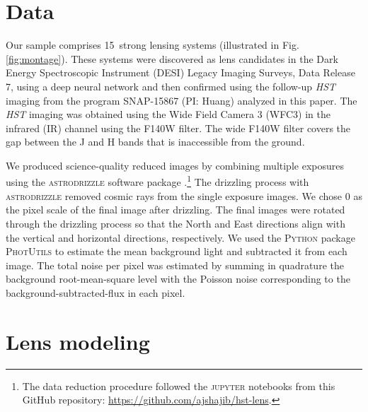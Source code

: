 \documentclass{aa}
\newcommand{\nlens}{15}
\begin{document}
\section{Data} \label{sec:data}

Our sample comprises \nlens\ strong lensing systems (illustrated in Fig. \ref{fig:montage}). These systems were discovered as lens candidates in the Dark Energy Spectroscopic Instrument (DESI) Legacy Imaging Surveys, Data Release 7, using a deep neural network and then confirmed using the follow-up \textit{HST} imaging from the program SNAP-15867 (PI: Huang) analyzed in this paper. %
The \textit{HST} imaging was obtained using the Wide Field Camera 3 (WFC3) in the infrared (IR) channel using the F140W filter. The wide F140W filter covers the gap between the J and H bands that is inaccessible from the ground. 

We produced science-quality reduced images by combining multiple exposures using the \textsc{astrodrizzle} software package \citep{Avila15}.\footnote{The data reduction procedure followed the \textsc{jupyter} notebooks from this GitHub repository: \url{https://github.com/ajshajib/hst-lens}.} The drizzling process with \textsc{astrodrizzle} removed cosmic rays from the single exposure images. We chose 0 as the pixel scale of the final image after drizzling. %
The final images were rotated through the drizzling process so that the North and East directions align with the vertical and horizontal directions, respectively. We used the \textsc{Python} package \textsc{PhotUtils} to estimate the mean background light and subtracted it from each image. The total noise per pixel was estimated by summing in quadrature the background root-mean-square level with the Poisson noise corresponding to the background-subtracted-flux in each pixel.






\section{Lens modeling} \label{sec:modeling_method}
\end{document}
